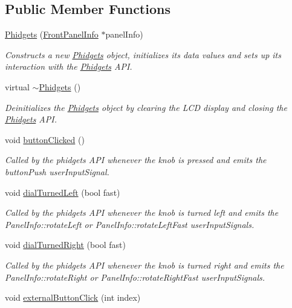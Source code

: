 \subsection*{Public Member Functions}
\begin{DoxyCompactItemize}
\item 
\hyperlink{class_phidgets_a0cb121d024743a04cc13b62ee256b9ce}{Phidgets} (\hyperlink{class_front_panel_info}{Front\-Panel\-Info} $\ast$panel\-Info)
\begin{DoxyCompactList}\small\item\em Constructs a new \hyperlink{class_phidgets}{Phidgets} object, initializes its data values and sets up its interaction with the \hyperlink{class_phidgets}{Phidgets} A\-P\-I. \end{DoxyCompactList}\item 
\hypertarget{class_phidgets_a63632587e91cd54861763eccee1d154c}{virtual \hyperlink{class_phidgets_a63632587e91cd54861763eccee1d154c}{$\sim$\-Phidgets} ()}\label{class_phidgets_a63632587e91cd54861763eccee1d154c}

\begin{DoxyCompactList}\small\item\em Deinitializes the \hyperlink{class_phidgets}{Phidgets} object by clearing the L\-C\-D display and closing the \hyperlink{class_phidgets}{Phidgets} A\-P\-I. \end{DoxyCompactList}\item 
\hypertarget{class_phidgets_a53cfa8a8488c9ca56aa10cb1049400ce}{void \hyperlink{class_phidgets_a53cfa8a8488c9ca56aa10cb1049400ce}{button\-Clicked} ()}\label{class_phidgets_a53cfa8a8488c9ca56aa10cb1049400ce}

\begin{DoxyCompactList}\small\item\em Called by the phidgets A\-P\-I whenever the knob is pressed and emits the button\-Push user\-Input\-Signal. \end{DoxyCompactList}\item 
void \hyperlink{class_phidgets_a224bc2b322e60fce68f515ee5504e2cd}{dial\-Turned\-Left} (bool fast)
\begin{DoxyCompactList}\small\item\em Called by the phidgets A\-P\-I whenever the knob is turned left and emits the Panel\-Info\-::rotate\-Left or Panel\-Info\-::rotate\-Left\-Fast user\-Input\-Signals. \end{DoxyCompactList}\item 
void \hyperlink{class_phidgets_a2f3335dae70f28d466f26c321be3cd04}{dial\-Turned\-Right} (bool fast)
\begin{DoxyCompactList}\small\item\em Called by the phidgets A\-P\-I whenever the knob is turned right and emits the Panel\-Info\-::rotate\-Right or Panel\-Info\-::rotate\-Right\-Fast user\-Input\-Signals. \end{DoxyCompactList}\item 
\hypertarget{class_phidgets_aa8fd54a481d892ad93379b42505b2943}{void \hyperlink{class_phidgets_aa8fd54a481d892ad93379b42505b2943}{external\-Button\-Click} (int index)}\label{class_phidgets_aa8fd54a481d892ad93379b42505b2943}


\end{DoxyCompactItemize}
